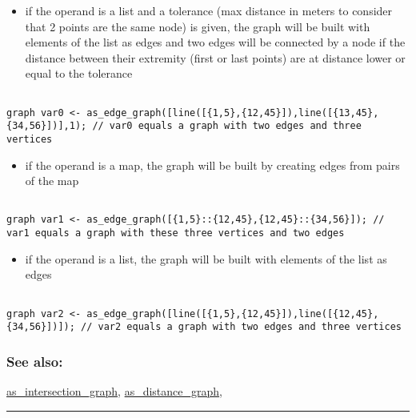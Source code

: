 \documentclass[]{book}
\providecommand{\tightlist}{%
  \setlength{\itemsep}{0pt}\setlength{\parskip}{0pt}}
\theoremstyle{definition}
\theoremstyle{definition}
\theoremstyle{definition}
\theoremstyle{remark}
\begin{document}
\begin{itemize}
\tightlist
\item
  if the operand is a list and a tolerance (max distance in meters to
  consider that 2 points are the same node) is given, the graph will be
  built with elements of the list as edges and two edges will be
  connected by a node if the distance between their extremity (first or
  last points) are at distance lower or equal to the tolerance
\end{itemize}

\begin{verbatim}
 
graph var0 <- as_edge_graph([line([{1,5},{12,45}]),line([{13,45},{34,56}])],1); // var0 equals a graph with two edges and three vertices
\end{verbatim}

\begin{itemize}
\tightlist
\item
  if the operand is a map, the graph will be built by creating edges
  from pairs of the map
\end{itemize}

\begin{verbatim}
 
graph var1 <- as_edge_graph([{1,5}::{12,45},{12,45}::{34,56}]); // var1 equals a graph with these three vertices and two edges
\end{verbatim}

\begin{itemize}
\tightlist
\item
  if the operand is a list, the graph will be built with elements of the
  list as edges
\end{itemize}

\begin{verbatim}
 
graph var2 <- as_edge_graph([line([{1,5},{12,45}]),line([{12,45},{34,56}])]); // var2 equals a graph with two edges and three vertices
\end{verbatim}

\subsubsection{See also:}\label{see-also-32}

\href{OperatorsAA\#as_intersection_graph}{as\_intersection\_graph},
\href{OperatorsAA\#as_distance_graph}{as\_distance\_graph},

\begin{center}\rule{0.5\linewidth}{\linethickness}\end{center}
\end{document}
